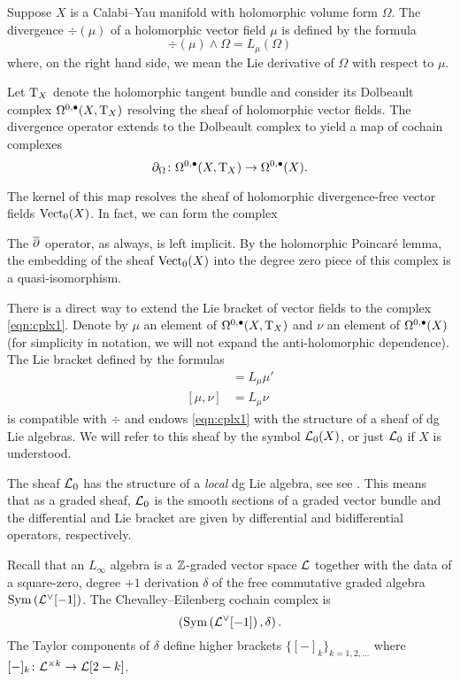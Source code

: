 \documentclass[11pt]{amsart}
\begin{document}
Suppose $X$ is a Calabi--Yau manifold with holomorphic volume form $\Omega$.
The divergence $\div(\mu)$ of a holomorphic vector field $\mu$ is defined by the formula
\[
\div (\mu) \wedge \Omega = L_\mu (\Omega)
\]
where, on the right hand side, we mean the Lie derivative of $\Omega$ with respect to $\mu$.

Let ${\rm T}_X$ denote the holomorphic tangent bundle and consider its Dolbeault complex $\Omega^{0,\bullet}(X , {\rm T}_X)$ resolving the sheaf of holomorphic vector fields. 
The divergence operator extends to the Dolbeault complex to yield a map of cochain complexes 
\[
\partial_{\Omega} \colon \Omega^{0,\bullet}(X , {\rm T}_X) \to \Omega^{0,\bullet}(X) .
\]

The kernel of this map resolves the sheaf of holomorphic divergence-free vector fields ${\rm Vect}_0 (X)$.
In fact, we can form the complex 
\beqn\label{eqn:cplx1}
\eeqn
The $\overline{\partial}$ operator, as always, is left implicit. 
By the holomorphic Poincar\'e lemma, the embedding of the sheaf ${\rm Vect}_0(X)$ into the degree zero piece of this complex is a quasi-isomorphism. 

There is a direct way to extend the Lie bracket of vector fields to the complex \eqref{eqn:cplx1}. 
Denote by $\mu$ an element of $\Omega^{0,\bullet}(X , {\rm T}_X)$ and $\nu$ an element of $\Omega^{0,\bullet}(X)$ (for simplicity in notation, we will not expand the anti-holomorphic dependence). 
The Lie bracket defined by the formulas
\begin{align*}
[\mu, \mu'] & = L_\mu \mu' \\
[\mu, \nu] & = L_\mu \nu 
\end{align*}
is compatible with $\div$ and endows \eqref{eqn:cplx1} with the structure of a sheaf of dg Lie algebras.
We will refer to this sheaf by the symbol $\mathcal L_0(X)$, or just $\mathcal L_0$ if $X$ is understood. 

The sheaf $\mathcal L_0$ has the structure of a {\em local} dg Lie algebra, see see \cite[??]{CG2}.
This means that as a graded sheaf, $\mathcal L_0$ is the smooth sections of a graded vector bundle and the differential and Lie bracket are given by differential and bidifferential operators, respectively.



Recall that an $L_\infty$ algebra is a $\mathbb Z$-graded vector space $\mathcal L$ together with the data of a square-zero, degree $+1$ derivation $\delta$ of the free commutative graded algebra $\operatorname{Sym}\left(\mathcal L^\vee [-1] \right)$. 
The Chevalley--Eilenberg cochain complex is 
\[
\left(\operatorname{Sym}\left(\mathcal L^\vee [-1] \right), \delta\right) .
\]
The Taylor components of $\delta$ define higher brackets $\{[-]_k\}_{k=1,2,\ldots}$ where $[-]_k \colon \mathcal L^{\times k} \to \mathcal L[2-k]$. 
\end{document}
